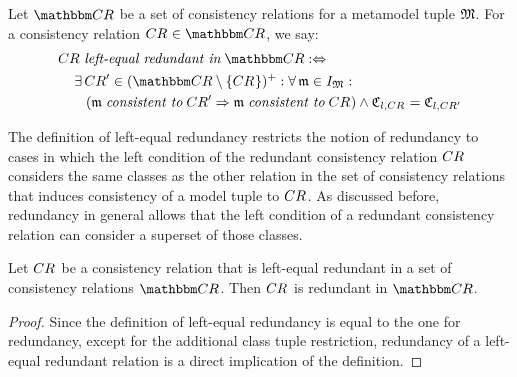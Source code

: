 \begin{definition} \label{def:leftequalredundancy}
    Let $\consistencyrelationset{CR}$ be a set of consistency relations for a metamodel tuple $\metamodeltuple{M}$.
    For a consistency relation $\consistencyrelation{CR}{} \in \consistencyrelationset{CR}$, we say:
    \begin{align*}
        &
        \consistencyrelation{CR}{} \leftequalredundantinmath \consistencyrelationset{CR} \equivalentperdefinition \\
        & \formulaskip 
        \exists \consistencyrelation{CR}{}' \in \transitiveclosure{(\consistencyrelationset{CR} \setminus \setted{\consistencyrelation{CR}{}})} : 
        \forall \modeltuple{m} \in \metamodeltupleinstanceset{M} :\\
        & \formulaskip\formulaskip
        (\modeltuple{m} \consistenttomath \consistencyrelation{CR}{}' \Rightarrow \modeltuple{m} \consistenttomath \consistencyrelation{CR}{})
        \land \classtuple{C}{l,\consistencyrelation{CR}{}} = \classtuple{C}{l,\consistencyrelation{CR}{}'}
    \end{align*}
\end{definition}

The definition of left-equal redundancy restricts the notion of redundancy to cases in which the left condition of the redundant consistency relation $\consistencyrelation{CR}{}$ considers the same classes as the other relation in the set of consistency relations that induces consistency of a model tuple to $\consistencyrelation{CR}{}$.
As discussed before, redundancy in general allows that the left condition of a redundant consistency relation can consider a superset of those classes.

\begin{lemma} \label{lemma:leftequalredundancyimpliesredundancy}
    Let $\consistencyrelation{CR}{}$ be a consistency relation that is left-equal redundant in a set of consistency relations $\consistencyrelationset{CR}$. Then $\consistencyrelation{CR}{}$ is redundant in $\consistencyrelationset{CR}$.
\end{lemma}
\begin{proof}
    Since the definition of left-equal redundancy is equal to the one for redundancy, except for the additional class tuple restriction, redundancy of a left-equal redundant relation is a direct implication of the definition.
\end{proof}

